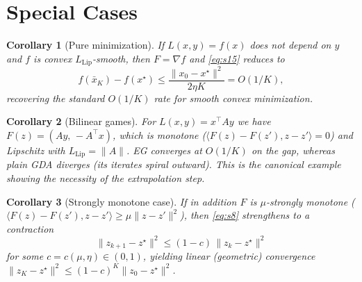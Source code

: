 \documentclass{article}
\newtheorem{corollary}{Corollary}
\begin{document}
\section*{Special Cases}

\begin{corollary}[Pure minimization]
If $L(x,y)=f(x)$ does not depend on $y$ and $f$ is convex
$L_{\mathrm{Lip}}$-smooth, then $F=\nabla f$ and \eqref{eq:s15} reduces to
\[
f(\bar x_K) - f(x^\star) \le \frac{\|x_0-x^\star\|^2}{2\eta K} = O(1/K),
\]
recovering the standard $O(1/K)$ rate for smooth convex minimization.
\end{corollary}

\begin{corollary}[Bilinear games]
For $L(x,y)=x^\top A y$ we have $F(z)=(Ay,\,-A^\top x)$, which is monotone
($\langle F(z)-F(z'),z-z'\rangle=0$) and Lipschitz with
$L_{\mathrm{Lip}}=\|A\|$. EG converges at $O(1/K)$ on the gap, whereas plain
GDA diverges (its iterates spiral outward). This is the canonical example
showing the necessity of the extrapolation step.
\end{corollary}

\begin{corollary}[Strongly monotone case]
If in addition $F$ is $\mu$-strongly monotone
($\langle F(z)-F(z'),z-z'\rangle \ge \mu\|z-z'\|^2$), then \eqref{eq:s8}
strengthens to a contraction
\[
\|z_{k+1}-z^\star\|^2 \le (1-c)\,\|z_k-z^\star\|^2
\]
for some $c=c(\mu,\eta)\in(0,1)$, yielding linear (geometric) convergence
$\|z_K-z^\star\|^2 \le (1-c)^K\|z_0-z^\star\|^2$.
\end{corollary}
\end{document}
